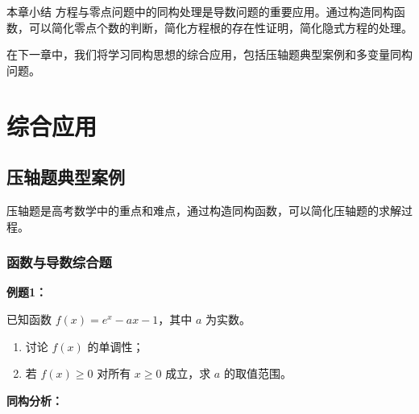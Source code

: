 \documentclass[a4paper,11pt]{ctexrep}
\newcommand{\exampleicon}{\ModeBadge[highlight]{例题}}
\newcommand{\analysisicon}{\ModeBadge[secondary]{分析}}
\theoremstyle{definition}
\begin{document}
\begin{summarybox}{本章小结}
方程与零点问题中的同构处理是导数问题的重要应用。通过构造同构函数，可以简化零点个数的判断，简化方程根的存在性证明，简化隐式方程的处理。

在下一章中，我们将学习同构思想的综合应用，包括压轴题典型案例和多变量同构问题。
\end{summarybox}

\chapter{综合应用}

\section{压轴题典型案例}

压轴题是高考数学中的重点和难点，通过构造同构函数，可以简化压轴题的求解过程。

\subsection{函数与导数综合题}

\exampleicon \textbf{例题1：}

已知函数 $f(x) = e^x - ax - 1$，其中 $a$ 为实数。
\begin{enumerate}
    \item 讨论 $f(x)$ 的单调性；
    \item 若 $f(x) \geq 0$ 对所有 $x \geq 0$ 成立，求 $a$ 的取值范围。
\end{enumerate}

\analysisicon \textbf{同构分析：}
\end{document}
